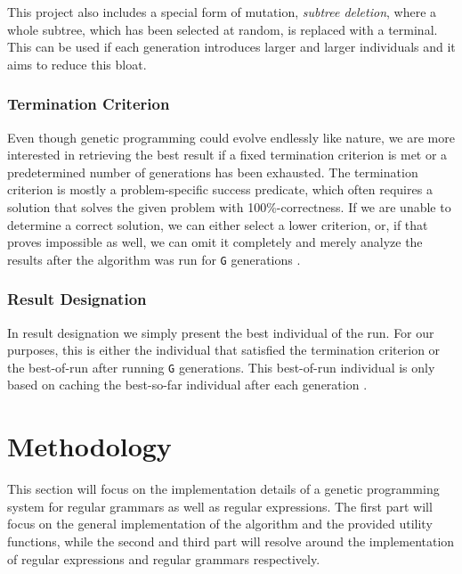 \documentclass[runningheads]{llncs}
\begin{document}
This project also includes a special form of mutation, \emph{subtree deletion}, where a whole subtree, which has been selected at random, is replaced with a terminal. This can be used if each generation introduces larger and larger individuals and it aims to reduce this bloat.

\subsubsection{Termination Criterion}
Even though genetic programming could evolve endlessly like nature, we are more interested in retrieving the best result if a fixed termination criterion is met or a predetermined number of generations has been exhausted. The termination criterion is mostly a problem-specific success predicate, which often requires a solution that solves the given problem with 100\%-correctness. If we are unable to determine a correct solution, we can either select a lower criterion, or, if that proves impossible as well, we can omit it completely and merely analyze the results after the algorithm was run for \texttt{G} generations \cite[113]{gp1-1993}.

\subsubsection{Result Designation}
In result designation we simply present the best individual of the run. For our purposes, this is either the individual that satisfied the termination criterion or the best-of-run after running \texttt{G} generations. This best-of-run individual is only based on caching the best-so-far individual after each generation \cite[113]{gp1-1993}.

\section{Methodology}
This section will focus on the implementation details of a genetic programming system for regular grammars as well as regular expressions. The first part will focus on the general implementation of the algorithm and the provided utility functions, while the second and third part will resolve around the implementation of regular expressions and regular grammars respectively.
\end{document}
